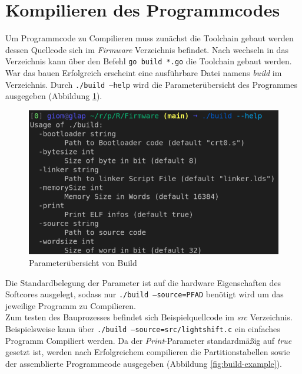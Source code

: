     \section{Kompilieren des Programmcodes}\label{lab:compile-code}
        Um Programmcode zu Compilieren muss zunächst die Toolchain gebaut werden
        dessen Quellcode sich im \textit{Firmware} Verzeichnis befindet.
        Nach wechseln in das Verzeichnis kann über den Befehl \texttt{go build *.go}
        die Toolchain gebaut werden. War das bauen Erfolgreich erscheint
        eine ausführbare Datei namens \textit{build} im Verzeichnis.
        Durch \texttt{./build --help} wird die Parameterübersicht des Programmes
        ausgegeben (Abbildung \ref{fig:build-help}).

        \begin{figure}[H]
            \centering
            \includegraphics[scale=1]{img/build_help.png}
            \caption{Parameterübersicht von Build}
            \label{fig:build-help}
        \end{figure}
        Die Standardbelegung der Parameter ist auf die hardware Eigenschaften des
        Softcores ausgelegt, sodass nur \texttt{./build --source=PFAD} benötigt wird
        um das jeweilige Programm zu Compilieren.
        \\
        Zum testen des Bauprozesses befindet sich Beispielquellcode im
        \textit{src} Verzeichnis.
        Beispielsweise kann über \texttt{./build --source=src/lightshift.c}
        ein einfaches Programm Compiliert werden. Da der \textit{Print}-Parameter
        standardmäßig auf \textit{true} gesetzt ist, werden nach Erfolgreichem
        compilieren die Partitionstabellen sowie der assemblierte Programmcode
        ausgegeben (Abbildung \ref{fig:build-example}).


